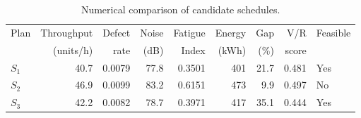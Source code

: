 \begin{table}[htbp]
\centering
\caption{Numerical comparison of candidate schedules.}
\label{tab:numerical-sim}
\small
\begin{tabular}{@{}lrrrrrrrl@{}}
\toprule
Plan & Throughput & Defect & Noise & Fatigue & Energy & Gap & V/R & Feasible \\
     & (units/h)  & rate   & (dB)  & Index   & (kWh)  & (\%) & score &         \\
\midrule
$S_{1}$ & 40.7 & 0.0079 & 77.8 & 0.3501 & 401 & 21.7 & 0.481 & Yes \\
$S_{2}$ & 46.9 & 0.0099 & 83.2 & 0.6151 & 473 & 9.9 & 0.497 & No \\
$S_{3}$ & 42.2 & 0.0082 & 78.7 & 0.3971 & 417 & 35.1 & 0.444 & Yes \\
\bottomrule
\end{tabular}
\end{table}
